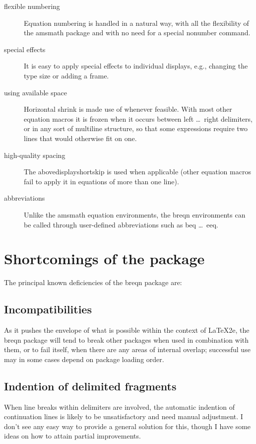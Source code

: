 \documentclass{article}
\def\latex/{{\protect\LaTeX}}
\newcommand{\ntt}{\normalfont\ttfamily}
\DeclareRobustCommand{\cs}[1]{{\ntt\ttbackslash#1}}
\let\cn=\cs
\DeclareRobustCommand{\pkg}[1]{{\ntt#1}}
\newcommand\thepkg[1]{the \pkg{breqn} package}
\begin{document}
\begin{description}
\item[flexible numbering] Equation numbering is handled in a natural
way, with all the flexibility of the \pkg{amsmath} package and with no
need for a special \cn{nonumber} command.

\item[special effects] It is easy to apply special effects to individual
displays, e.g., changing the type size or adding a frame.

\item[using available space] Horizontal shrink is made use of
whenever feasible. With most other equation macros it is frozen when it
occurs between \cn{left} \dots\ \cn{right} delimiters, or in any sort of
multiline structure, so that some expressions require two lines that would
otherwise fit on one.

\item[high-quality spacing] The \cn{abovedisplayshortskip} is used when
applicable (other equation macros fail to apply it in equations of more
than one line).

\item[abbreviations] Unlike the \pkg{amsmath} equation environments, the
\pkg{breqn} environments can be called through user-defined abbreviations
such as \cn{beq} \dots\ \cn{eeq}.

\end{description}

\section{Shortcomings of the package}
The principal known deficiencies of the \pkg{breqn} package are:

\subsection{Incompatibilities} As it pushes the envelope
of what is possible within the context of \latex/2e, \thepkg/ will tend
to break other packages when used in combination with them, or to fail
itself, when there are any areas of internal overlap; successful use may
in some cases depend on package loading order.

\subsection{Indention of delimited fragments} When line breaks within
delimiters are involved, the automatic indention of continuation lines
is likely to be unsatisfactory and need manual adjustment. I don't see
any easy way to provide a general solution for this, though I have some
ideas on how to attain partial improvements.
\end{document}
